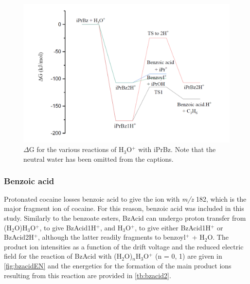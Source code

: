 




\begin{figure}[htbp]
\centering
\includegraphics[width=0.7\linewidth]{pics/cocaine-chapter/iprbz_deltag.png}
\caption{$\Delta$G for the various reactions of H$_3$O$^+$ with iPrBz. Note that the neutral water has been omitted from the captions.}
\label{fig:iprbz_deltag}
\end{figure}










\subsubsection{Benzoic acid}\label{section:BzAcid}
Protonated cocaine losses benzoic acid to give the ion with \textit{m/z} 182, which is the major fragment ion of cocaine.
%
For this reason, benzoic acid was included in this study.
%
%
%
%
Similarly to the benzoate esters, BzAcid can undergo proton transfer from (H$_2$O)H$_3$O$^+$, to give BzAcid1H$^+$, and H$_3$O$^+$, to give either BzAcid1H$^+$ or BzAcid2H$^+$, although the latter readily fragments to benzoyl$^+$ + H$_2$O. 
%
The product ion intensities as a function of the drift voltage and the reduced electric field for the reaction of BzAcid with (H$_2$O)$_n$H$_3$O$^+$ (n = 0, 1) are given in \autoref{fig:bzacidEN} and the energetics for the formation of the main product ions resulting from this reaction are provided in \autoref{tb:bzacid2}.

